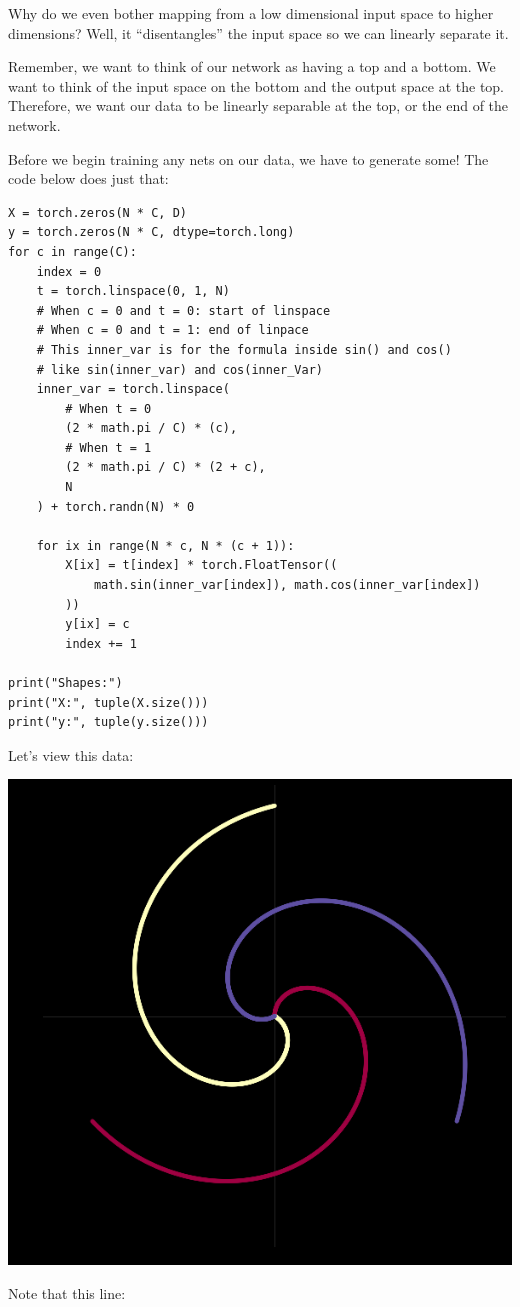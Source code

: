 Why do we even bother mapping from a low dimensional input space to higher dimensions? 
Well, it ``disentangles'' the input space so we can linearly separate it. 

Remember, we want to think of our network as having a top and a bottom. 
We want to think of the input space on the bottom and the output space at the top. 
Therefore, we want our data to be linearly separable at the top, or the end of the network. 

Before we begin training any nets on our data, we have to generate some! The code below does just that:

\begin{verbatim}
X = torch.zeros(N * C, D)
y = torch.zeros(N * C, dtype=torch.long)
for c in range(C):
    index = 0
    t = torch.linspace(0, 1, N)
    # When c = 0 and t = 0: start of linspace
    # When c = 0 and t = 1: end of linpace
    # This inner_var is for the formula inside sin() and cos()
    # like sin(inner_var) and cos(inner_Var)
    inner_var = torch.linspace(
        # When t = 0
        (2 * math.pi / C) * (c),
        # When t = 1
        (2 * math.pi / C) * (2 + c),
        N
    ) + torch.randn(N) * 0
    
    for ix in range(N * c, N * (c + 1)):
        X[ix] = t[index] * torch.FloatTensor((
            math.sin(inner_var[index]), math.cos(inner_var[index])
        ))
        y[ix] = c
        index += 1

print("Shapes:")
print("X:", tuple(X.size()))
print("y:", tuple(y.size()))
\end{verbatim}

Let's view this data: 

\begin{center}
	\includegraphics[width=0.5\linewidth]{lectures/03-a/images/data_no_noise.png}
\end{center}

Note that this line:

